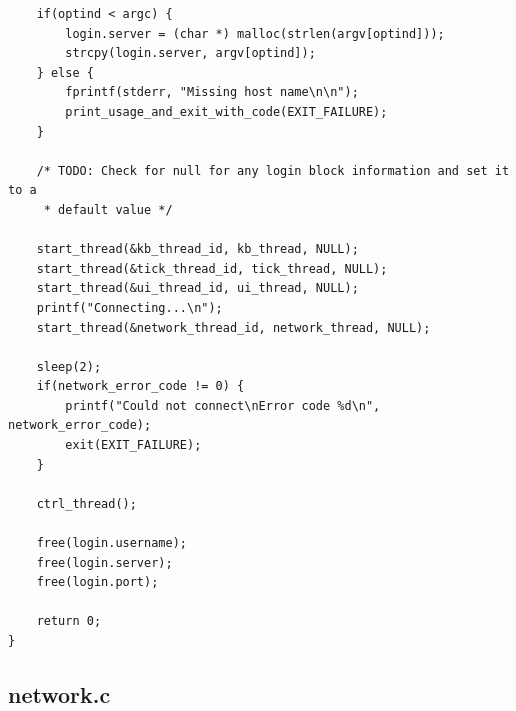 \documentclass{article}
\begin{document}
\begin{verbatim}
    if(optind < argc) {
        login.server = (char *) malloc(strlen(argv[optind]));
        strcpy(login.server, argv[optind]);
    } else {
        fprintf(stderr, "Missing host name\n\n");
        print_usage_and_exit_with_code(EXIT_FAILURE);
    }
    
    /* TODO: Check for null for any login block information and set it to a
     * default value */
    
    start_thread(&kb_thread_id, kb_thread, NULL);
    start_thread(&tick_thread_id, tick_thread, NULL);
    start_thread(&ui_thread_id, ui_thread, NULL);
    printf("Connecting...\n");
    start_thread(&network_thread_id, network_thread, NULL);
    
    sleep(2);
    if(network_error_code != 0) {
        printf("Could not connect\nError code %d\n", network_error_code);
        exit(EXIT_FAILURE);
    }
    
    ctrl_thread();
    
    free(login.username);
    free(login.server);
    free(login.port);
    
    return 0;
}

\end{verbatim}

\subsection*{network.c}
\end{document}
